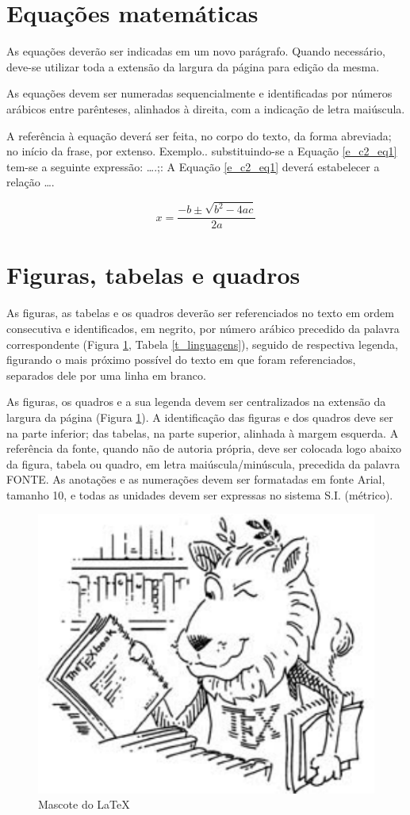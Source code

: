 \documentclass[12pt]{article}
\begin{document}
\section{Equações matemáticas}

As equações deverão ser indicadas em um novo parágrafo. Quando necessário, deve-se utilizar toda a extensão da largura da página para edição da mesma.

As equações devem ser numeradas sequencialmente e identificadas por números arábicos entre parênteses, alinhados à direita, com a indicação de letra maiúscula. 

A referência à equação deverá ser feita, no corpo do texto, da forma abreviada; no início da frase, por extenso. Exemplo.. substituindo-se a Equação \ref{e_c2_eq1} tem-se a seguinte expressão: \ldots.;: A Equação \ref{e_c2_eq1} deverá estabelecer a relação \ldots.


\begin{equation}
 x=\frac{-b\pm\sqrt{b^2-4ac}}{2a}
\label{e_c2_eq1}
\end{equation}

\section{Figuras, tabelas e quadros}

As figuras, as tabelas e os quadros deverão ser referenciados no texto em ordem consecutiva e identificados, em negrito, por número arábico precedido da palavra correspondente (Figura \ref{f_mascote}, Tabela \ref{t_linguagens}), seguido de respectiva legenda, figurando o mais próximo possível do texto em que foram referenciados, separados dele por uma linha em branco. 

As figuras, os quadros e a sua legenda devem ser centralizados na extensão da largura da página (Figura \ref{f_mascote}). A identificação das figuras e dos quadros deve ser na parte inferior; das tabelas, na parte superior, alinhada à margem esquerda. A referência da fonte, quando não de autoria própria, deve ser colocada logo abaixo da figura, tabela ou quadro, em letra maiúscula/minúscula, precedida da palavra FONTE. As anotações e as numerações devem ser formatadas em fonte Arial, tamanho 10, e todas as unidades devem ser expressas no sistema S.I. (métrico).

\begin{figure}[!htpb]
	\centering
	\includegraphics[width=.4\columnwidth]{figs/lion}
	\caption{Mascote do \LaTeX}
	\label{f_mascote}
\end{figure}
\end{document}
